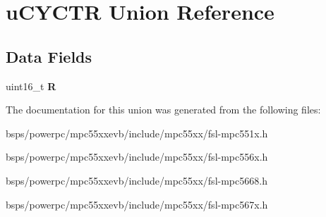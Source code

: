 \hypertarget{unionuCYCTR}{}\section{u\+C\+Y\+C\+TR Union Reference}
\label{unionuCYCTR}
\subsection*{Data Fields}
\begin{DoxyCompactItemize}
\item 
\mbox{\label{unionuCYCTR_aca4f6e9f481698827e4b8135c598094f}} 
uint16\+\_\+t {\bfseries R}
\end{DoxyCompactItemize}


The documentation for this union was generated from the following files\+:\begin{DoxyCompactItemize}
\item 
bsps/powerpc/mpc55xxevb/include/mpc55xx/fsl-\/mpc551x.\+h\item 
bsps/powerpc/mpc55xxevb/include/mpc55xx/fsl-\/mpc556x.\+h\item 
bsps/powerpc/mpc55xxevb/include/mpc55xx/fsl-\/mpc5668.\+h\item 
bsps/powerpc/mpc55xxevb/include/mpc55xx/fsl-\/mpc567x.\+h\end{DoxyCompactItemize}
